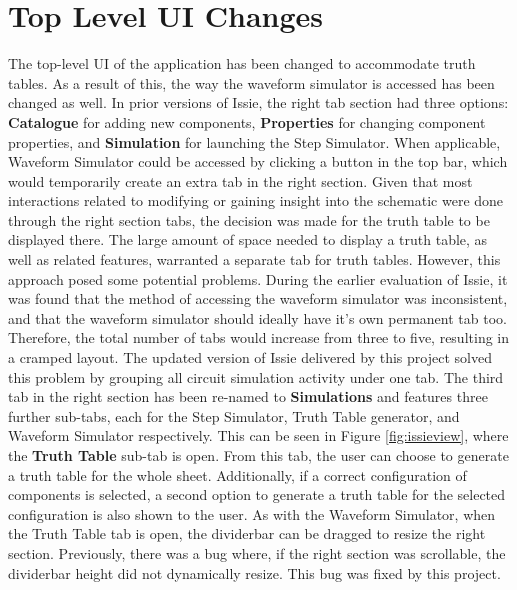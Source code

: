 
\section{Top Level UI Changes}
The top-level UI of the application has been changed to accommodate truth tables. As a result of this, the way the waveform simulator is accessed has been changed as well. In prior versions of Issie, the right tab section had three options: \textbf{Catalogue} for adding new components, \textbf{Properties} for changing component properties, and \textbf{Simulation} for launching the Step Simulator. When applicable, Waveform Simulator could be accessed by clicking a button in the top bar, which would temporarily create an extra tab in the right section. Given that most interactions related to modifying or gaining insight into the schematic were done through the right section tabs, the decision was made for the truth table to be displayed there. The large amount of space needed to display a truth table, as well as related features, warranted a separate tab for truth tables. However, this approach posed some potential problems. During the earlier evaluation of Issie, it was found that the method of accessing the waveform simulator was inconsistent, and that the waveform simulator should ideally have it's own permanent tab too. Therefore, the total number of tabs would increase from three to five, resulting in a cramped layout. 
The updated version of Issie delivered by this project solved this problem by grouping all circuit simulation activity under one tab. The third tab in the right section has been re-named to \textbf{Simulations} and features three further sub-tabs, each for the Step Simulator, Truth Table generator, and Waveform Simulator respectively. This can be seen in Figure \ref{fig:issieview}, where the \textbf{Truth Table} sub-tab is open. 
From this tab, the user can choose to generate a truth table for the whole sheet. Additionally, if a correct configuration of components is selected, a second option to generate a truth table for the selected configuration is also shown to the user. As with the Waveform Simulator, when the Truth Table tab is open, the dividerbar can be dragged to resize the right section. Previously, there was a bug where, if the right section was scrollable, the dividerbar height did not dynamically resize. This bug was fixed by this project.
